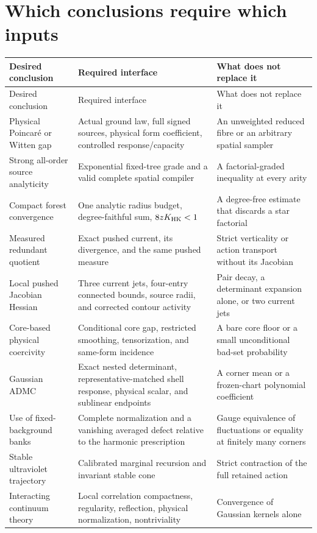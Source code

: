 \documentclass[11pt,oneside,openany]{book}
\theoremstyle{definition}
\theoremstyle{remark}
\begin{document}
\section{Which conclusions require which inputs}
\begin{longtable}{L{0.27\textwidth}L{0.34\textwidth}L{0.29\textwidth}}
\toprule Desired conclusion & Required interface & What does not replace it \\ \midrule
\endfirsthead
\toprule Desired conclusion & Required interface & What does not replace it \\ \midrule
\endhead
Physical Poincar\'e or Witten gap & Actual ground law, full signed sources, physical form coefficient, controlled response/capacity & An unweighted reduced fibre or an arbitrary spatial sampler \\
Strong all-order source analyticity & Exponential fixed-tree grade and a valid complete spatial compiler & A factorial-graded inequality at every arity \\
Compact forest convergence & One analytic radius budget, degree-faithful sum, $8zK_{\rm HK}<1$ & A degree-free estimate that discards a star factorial \\
Measured redundant quotient & Exact pushed current, its divergence, and the same pushed measure & Strict verticality or action transport without its Jacobian \\
Local pushed Jacobian Hessian & Three current jets, four-entry connected bounds, source radii, and corrected contour activity & Pair decay, a determinant expansion alone, or two current jets \\
Core-based physical coercivity & Conditional core gap, restricted smoothing, tensorization, and same-form incidence & A bare core floor or a small unconditional bad-set probability \\
Gaussian ADMC & Exact nested determinant, representative-matched shell response, physical scalar, and sublinear endpoints & A corner mean or a frozen-chart polynomial coefficient \\
Use of fixed-background banks & Complete normalization and a vanishing averaged defect relative to the harmonic prescription & Gauge equivalence of fluctuations or equality at finitely many corners \\
Stable ultraviolet trajectory & Calibrated marginal recursion and invariant stable cone & Strict contraction of the full retained action \\
Interacting continuum theory & Local correlation compactness, regularity, reflection, physical normalization, nontriviality & Convergence of Gaussian kernels alone \\

\end{longtable}
\end{document}

